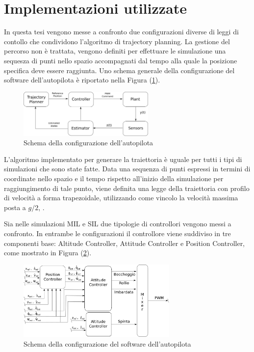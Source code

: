 \section{Implementazioni utilizzate}
In questa tesi vengono messe a confronto due configurazioni diverse di leggi di contollo che condividono l'algoritmo di trajectory planning. La gestione del percorso non è trattata, vengono definiti per effettuare le simulazione una sequesza di punti nello spazio accompagnati dal tempo alla quale la posizione specifica deve essere raggiunta.
Uno schema generale della configurazione del software dell'autopilota è riportato nella Figura (\ref{fig:Autopilota}).

\begin{figure}
	\centering
	\includegraphics[width=0.6\textwidth]{SistemaQuadrirotore/Figure/Autopilota}
	\caption{Schema della configurazione dell'autopilota}
	\label{fig:Autopilota}
\end{figure}

L'algoritmo implementato per generare la traiettoria è uguale per tutti i tipi di simulazioni che sono state fatte. Data una sequenza di punti espressi in termini di coordinate nello spazio e il tempo rispetto all'inizio della simulazione per raggiungimento di tale punto, viene definita una legge della traiettoria con profilo di velocità a forma trapezoidale, utilizzando come vincolo la velocità massima posta a $g/2$, \cite{DesTestCarm}.

Sia nelle simulazioni MIL e SIL due tipologie di controllori vengono messi a confronto. In entrambe le configurazioni il controllore viene suddiviso in tre componenti base: Altitude Controller, Attitude Controller e Position Controller, come mostrato in Figura (\ref{fig:Controller}).


\begin{figure}
	\centering
	\includegraphics[width=0.7\textwidth]{SistemaQuadrirotore/Figure/Controllore}
	\caption{Schema della configurazione del software dell'autopilota}
	\label{fig:Controller}
\end{figure}